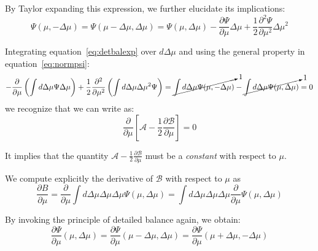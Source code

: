 
By Taylor expanding this expression, we further elucidate its implications:
%
\begin{equation}\label{eq:detbalexp}
\Psi(\mu, -\Delta\mu ) = \Psi(\mu-\Delta\mu , \Delta\mu )=\Psi(\mu,\Delta\mu )-\frac{\partial \Psi}{\partial \mu} \Delta\mu +\frac{1}{2}\frac{\partial^2 \Psi}{\partial\mu^2} \Delta\mu^2
\end{equation}

Integrating equation~\eqref{eq:detbalexp} over \(d\Delta\mu\) and using the general property in equation~\eqref{eq:normpsi}:
%
\begin{equation}
-\frac{\partial}{\partial \mu} \left( \int d\Delta\mu \Psi \Delta\mu \right) + \frac{1}{2}\frac{\partial^2}{\partial\mu^2}\left( \int d\Delta\mu \Delta\mu^2 \Psi \right) = \cancelto{1}{\int d\Delta\mu \Psi(\mu, -\Delta\mu )} - \cancelto{1}{\int d\Delta\mu \Psi(\mu,\Delta\mu)} = 0
\end{equation}
%
we recognize that we can write as:
%
%
\begin{equation}
\frac{\partial}{\partial\mu}\left[ \mathcal A-\frac{1}{2}\frac{\partial \mathcal B}{\partial \mu}\right] = 0
\end{equation}

It implies that the quantity \( \mathcal A - \frac{1}{2} \frac{\partial \mathcal B}{\partial \mu} \) must be a \emph{constant} with respect to \( \mu \).  

We compute explicitly the derivative of \( \mathcal B \) with respect to \( \mu \) as
%
\begin{equation}
\frac{\partial B}{\partial \mu} = \frac{\partial}{\partial\mu} \int d\Delta\mu \Delta\mu\Delta\mu \Psi(\mu,  \Delta\mu)
=   \int d\Delta\mu \Delta\mu\Delta\mu \frac{\partial}{\partial\mu} \Psi(\mu,  \Delta\mu)
\end{equation}

By invoking the principle of detailed balance again, we obtain:
%
\begin{equation}
\frac{\partial\Psi}{\partial\mu}(\mu,\Delta\mu) = \frac{\partial\Psi}{\partial\mu}(\mu-\Delta\mu,\Delta\mu)=\frac{\partial\Psi}{\partial\mu}(\mu+\Delta\mu ,-\Delta\mu)
\end{equation}

